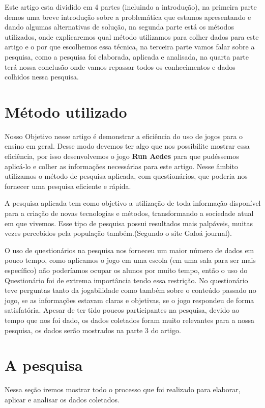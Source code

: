 \documentclass[12pt]{article}
\begin{document}
	Este artigo esta dividido em 4 partes (incluindo a introdução), na primeira parte demos uma breve introdução sobre a problemática que estamos apresentando e dando algumas alternativas de solução, na segunda parte está os métodos utilizados, onde explicaremos qual método utilizamos para colher dados para este artigo e o por que escolhemos essa técnica, na terceira parte vamos falar sobre a pesquisa, como a pesquisa foi elaborada, aplicada e analisada, na quarta parte terá nossa conclusão onde vamos repassar todos os conhecimentos e dados colhidos nessa pesquisa.
	
		
		
	\section{Método utilizado}%
	Nosso Objetivo nesse artigo é demonstrar a eficiência do uso de jogos para o ensino em geral. Desse modo devemos ter algo que nos possibilite mostrar essa eficiência, por isso desenvolvemos o jogo \textbf{Run Aedes} para que pudéssemos aplicá-lo e colher as informações necessárias para este artigo. Nesse âmbito utilizamos o método de pesquisa aplicada, com questionários, que poderia nos fornecer uma pesquisa eficiente e rápida.
	
	A pesquisa aplicada tem como objetivo a utilização de toda informação disponível para a criação de novas tecnologias e métodos, transformando a sociedade atual em que vivemos. Esse tipo de pesquisa possui resultados mais palpáveis, muitas vezes percebidos pela população também.(Segundo o site Galoá journal).
	
	O uso de questionários na pesquisa nos forneceu um maior número de dados em pouco tempo, como aplicamos o jogo em uma escola (em uma sala para ser mais específico) não poderíamos ocupar os alunos por muito tempo, então o uso do Questionário foi de extrema importância tendo essa restrição. No questionário teve perguntas tanto da jogabilidade como também sobre o conteúdo passado no jogo, se as informações estavam claras e objetivas, se o jogo respondeu de forma satisfatória. Apesar de ter tido poucos participantes na pesquisa, devido ao tempo que nos foi dado, os dados coletados foram muito relevantes para a nossa pesquisa, os dados serão mostrados na parte 3 do artigo.
	
	
	
	\section{A pesquisa} %
		Nessa seção iremos mostrar todo o processo que foi realizado para elaborar, aplicar e analisar os dados coletados.\\
\end{document}
